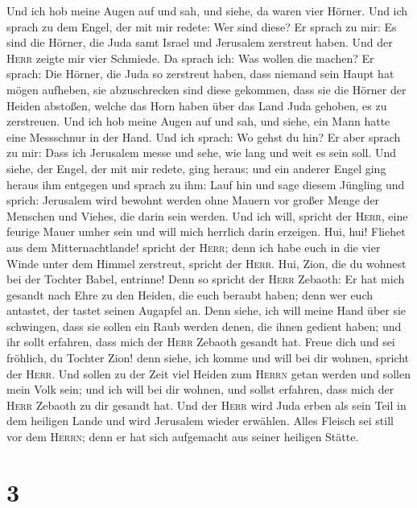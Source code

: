  Und ich hob meine Augen auf und sah, und siehe, da waren
vier Hörner.  Und ich sprach zu dem Engel, der mit mir
redete: Wer sind diese? Er sprach zu mir: Es sind die Hörner, die Juda
samt Israel und Jerusalem zerstreut haben.  Und der
\textsc{Herr} zeigte mir vier Schmiede.  Da sprach ich:
Was wollen die machen? Er sprach: Die Hörner, die Juda so zerstreut
haben, dass niemand sein Haupt hat mögen aufheben, sie abzuschrecken
sind diese gekommen, dass sie die Hörner der Heiden abstoßen, welche das
Horn haben über das Land Juda gehoben, es zu zerstreuen. 
Und ich hob meine Augen auf und sah, und siehe, ein Mann hatte eine
Messschnur in der Hand.  Und ich sprach: Wo gehst du hin?
Er aber sprach zu mir: Dass ich Jerusalem messe und sehe, wie lang und
weit es sein soll.  Und siehe, der Engel, der mit mir
redete, ging heraus; und ein anderer Engel ging heraus ihm entgegen
 und sprach zu ihm: Lauf hin und sage diesem Jüngling und
sprich: Jerusalem wird bewohnt werden ohne Mauern vor großer Menge der
Menschen und Viehes, die darin sein werden.  Und ich will,
spricht der \textsc{Herr}, eine feurige Mauer umher sein und will mich
herrlich darin erzeigen.  Hui, hui! Fliehet aus dem
Mitternachtlande! spricht der \textsc{Herr}; denn ich habe euch in die
vier Winde unter dem Himmel zerstreut, spricht der \textsc{Herr}.
 Hui, Zion, die du wohnest bei der Tochter Babel,
entrinne!  Denn so spricht der \textsc{Herr} Zebaoth: Er
hat mich gesandt nach Ehre zu den Heiden, die euch beraubt haben; denn
wer euch antastet, der tastet seinen Augapfel an.  Denn
siehe, ich will meine Hand über sie schwingen, dass sie sollen ein Raub
werden denen, die ihnen gedient haben; und ihr sollt erfahren, dass mich
der \textsc{Herr} Zebaoth gesandt hat.  Freue dich und
sei fröhlich, du Tochter Zion! denn siehe, ich komme und will bei dir
wohnen, spricht der \textsc{Herr}.  Und sollen zu der
Zeit viel Heiden zum \textsc{Herrn} getan werden und sollen mein Volk
sein; und ich will bei dir wohnen, und sollst erfahren, dass mich der
\textsc{Herr} Zebaoth zu dir gesandt hat.  Und der
\textsc{Herr} wird Juda erben als sein Teil in dem heiligen Lande und
wird Jerusalem wieder erwählen.  Alles Fleisch sei still
vor dem \textsc{Herrn}; denn er hat sich aufgemacht aus seiner heiligen
Stätte.

\hypertarget{section-2}{%
\section{3}\label{section-2}}

